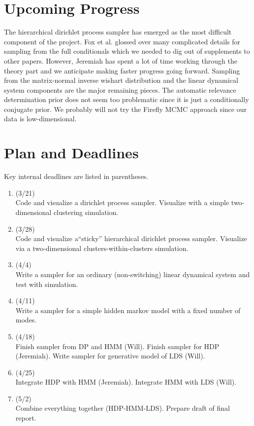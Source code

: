 \documentclass[12pt]{article}
\begin{document}
\section{\textbf{Upcoming Progress}}
The hierarchical dirichlet process sampler has emerged as the most difficult component of the project. Fox et al. glossed over many complicated details for sampling from the full conditionals which we needed to dig out of supplements to other papers. However, Jeremiah has spent a lot of time working through the theory part and we anticipate making faster progress going forward. Sampling from the matrix-normal inverse wishart distribution and the linear dynamical system components are the major remaining pieces. The automatic relevance determination prior does not seem too problematic since it is just a conditionally conjugate prior. We probably will not try the Firefly MCMC approach since our data is low-dimensional.

\newpage
\section{\textbf{Plan and Deadlines}}
Key internal deadlines are listed in parentheses.
\begin{enumerate}
\item (3/21) \\Code and visualize a dirichlet process sampler. Visualize with a simple two-dimensional clustering simulation.
\item (3/28) \\Code and visualize a``sticky'' hierarchical dirichlet process sampler. Visualize via a two-dimensional clusters-within-clusters simulation.
\item (4/4) \\Write a sampler for an ordinary (non-switching) linear dynamical system and test with simulation.
\item (4/11) \\Write a sampler for a simple hidden markov model with a fixed number of modes.
\item (4/18) \\Finish sampler from DP and HMM (Will). Finish sampler for HDP (Jeremiah). Write sampler for generative model of LDS (Will).
\item (4/25) \\Integrate HDP with HMM (Jeremiah). Integrate HMM with LDS (Will).
\item (5/2) \\Combine everything together (HDP-HMM-LDS). Prepare draft of final report.
\end{enumerate}

\newpage



\end{document}
